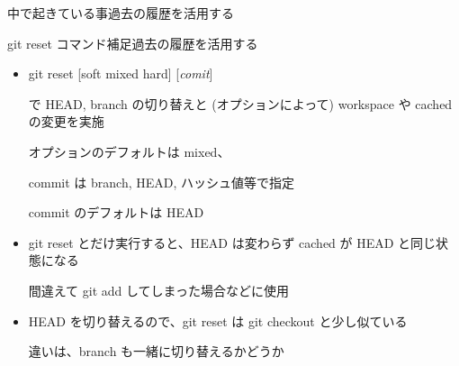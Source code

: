 \begin{frame}[t]{中で起きている事}{過去の履歴を活用する}




\end{frame}

\begin{frame}[t]{git reset コマンド補足}{過去の履歴を活用する}

  \begin{itemize}
  \item git reset [{\dhyphen}soft {\vbar} {\dhyphen}mixed {\vbar} {\dhyphen}hard] [\textit{comit}]

    で HEAD, branch の切り替えと (オプションによって) workspace や cached の変更を実施

    オプションのデフォルトは {\dhyphen}mixed、

    commit は branch, HEAD, ハッシュ値等で指定

    commit のデフォルトは HEAD
    \vspace{2ex}

  \item git reset とだけ実行すると、HEAD は変わらず cached が HEAD と同じ状態になる

    間違えて git add してしまった場合などに使用
    \vspace{2ex}

  \item HEAD を切り替えるので、git reset は git checkout と少し似ている

    違いは、branch も一緒に切り替えるかどうか
  \end{itemize}

\end{frame}
